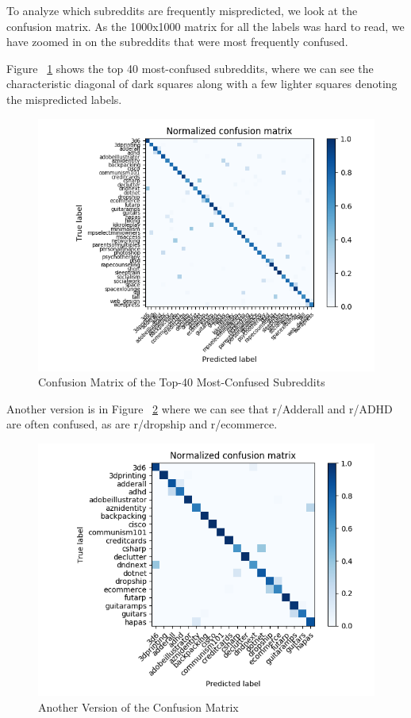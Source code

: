 \documentclass{sig-alternate-05-2015}
\begin{document}
To analyze which subreddits are frequently mispredicted, we look at the confusion matrix. As the 1000x1000 matrix for all the labels was hard to read, we have zoomed in on the subreddits that were most frequently confused.

Figure ~\ref{fig:confusionMatrix1} shows the top 40 most-confused subreddits, where we can see the characteristic diagonal of dark squares along with a few lighter squares denoting the mispredicted labels.

\begin{figure}[H]
\centering
\includegraphics[width=\linewidth]{plots/confusion-matrix-top-confused-labels-all.png}
\caption{Confusion Matrix of the Top-40 Most-Confused Subreddits}
\label{fig:confusionMatrix1}
\end{figure}

Another version is in Figure ~\ref{fig:confusionMatrix2} where we can see that r/Adderall and r/ADHD are often confused, as are r/dropship and r/ecommerce.

\begin{figure}[H]
\centering
\includegraphics[width=\linewidth]{plots/confusion-matrix-top-confused-labels-0-to-20.png}
\caption{Another Version of the Confusion Matrix}
\label{fig:confusionMatrix2}
\end{figure}
\end{document}
